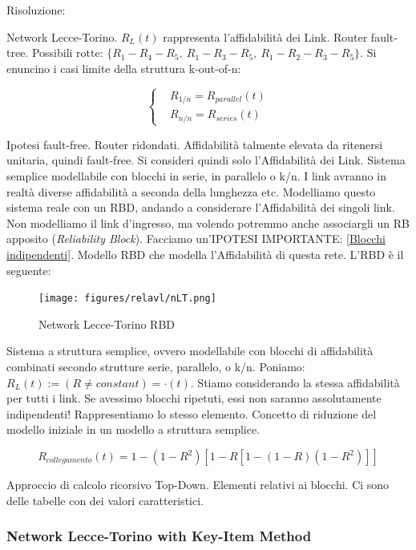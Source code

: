 Risoluzione:

Network Lecce-Torino. $R_L(t)$ rappresenta l'affidabilità dei Link. Router fault-tree. Possibili rotte: $\{R_1-R_4-R_5,\ R_1-R_3-R_5,\ R_1-R_2-R_3-R_5\}$. Si enuncino i casi limite della struttura k-out-of-n:

\[
	\left\{
	\begin{aligned}
	&R_{1/n} = R_{parallel}(t)\\
	&R_{n/n} = R_{series}(t)
	\end{aligned}
	\right.
\]

Ipotesi fault-free. Router ridondati. Affidabilità talmente elevata da ritenersi unitaria, quindi fault-free. Si consideri quindi solo l'Affidabilità dei Link. Sistema semplice modellabile con blocchi in serie, in parallelo o k/n. I link avranno in realtà diverse affidabilità a seconda della lunghezza etc. Modelliamo questo sistema reale con un RBD, andando a considerare l'Affidabilità dei singoli link. Non modelliamo il link d'ingresso, ma volendo potremmo anche associargli un RB apposito (\textit{Reliability Block}). Facciamo un'IPOTESI IMPORTANTE: [\underline{Blocchi indipendenti}]. Modello RBD che modella l'Affidabilità di questa rete. L'RBD è il seguente:

\begin{center}
\begin{figure}[H]
\centering
\texttt{[image: figures/relavl/nLT.png]}
\caption{Network Lecce-Torino RBD}
\end{figure}
\end{center}

Sistema a struttura semplice, ovvero modellabile con blocchi di affidabilità combinati secondo strutture serie, parallelo, o k/n. Poniamo: $R_L(t) := (R\neq constant) = \mathord{\cdot}(t)$. Stiamo considerando la stessa affidabilità per tutti i link. Se avessimo blocchi ripetuti, essi non saranno assolutamente indipendenti! Rappresentiamo lo stesso elemento. Concetto di riduzione del modello iniziale in un modello a struttura semplice.

\[
	R_{collegamento}(t) = 1-(1-R^2)[1-R[1-(1-R)(1-R^2)]]
\]

Approccio di calcolo ricorsivo Top-Down. Elementi relativi ai blocchi. Ci sono delle tabelle con dei valori caratteristici.

\subsubsection{Network Lecce-Torino with Key-Item Method}

